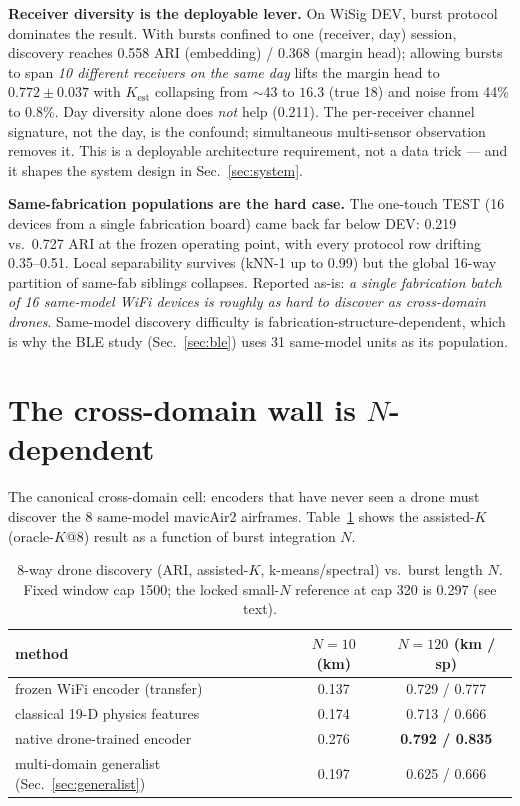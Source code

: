 \documentclass[conference]{IEEEtran}
\begin{document}
\textbf{Receiver diversity is the deployable lever.} On WiSig DEV, burst protocol dominates the
result. With bursts confined to one (receiver, day) session, discovery reaches 0.558 ARI
(embedding) / 0.368 (margin head); allowing bursts to span \emph{10 different receivers on the
same day} lifts the margin head to $0.772\pm0.037$ with $K_{\mathrm{est}}$ collapsing from
$\sim$43 to $16.3$ (true 18) and noise from 44\% to 0.8\%. Day diversity alone does \emph{not}
help (0.211). The per-receiver channel signature, not the day, is the confound; simultaneous
multi-sensor observation removes it. This is a deployable architecture requirement, not a data
trick --- and it shapes the system design in Sec.~\ref{sec:system}.

\textbf{Same-fabrication populations are the hard case.} The one-touch TEST (16 devices from a
single fabrication board) came back far below DEV: 0.219 vs.\ 0.727 ARI at the frozen operating
point, with every protocol row drifting 0.35--0.51. Local separability survives (kNN-1 up to
0.99) but the global 16-way partition of same-fab siblings collapses. Reported as-is: \emph{a
single fabrication batch of 16 same-model WiFi devices is roughly as hard to discover as
cross-domain drones}. Same-model discovery difficulty is fabrication-structure-dependent, which
is why the BLE study (Sec.~\ref{sec:ble}) uses 31 same-model units as its population.

\section{The cross-domain wall is $N$-dependent}
\label{sec:wall}

The canonical cross-domain cell: encoders that have never seen a drone must discover the 8
same-model mavicAir2 airframes. Table~\ref{tab:wall} shows the assisted-$K$ (oracle-$K$@8)
result as a function of burst integration $N$.

\begin{table}[t]
\caption{8-way drone discovery (ARI, assisted-$K$, k-means/spectral) vs.\ burst length $N$.
Fixed window cap 1500; the locked small-$N$ reference at cap 320 is 0.297 (see text).}
\label{tab:wall}
\centering\small
\begin{tabular}{lcc}
\toprule
method & $N{=}10$ (km) & $N{=}120$ (km / sp) \\
\midrule
frozen WiFi encoder (transfer) & 0.137 & 0.729 / 0.777 \\
classical 19-D physics features & 0.174 & 0.713 / 0.666 \\
native drone-trained encoder & 0.276 & \textbf{0.792 / 0.835} \\
multi-domain generalist (Sec.~\ref{sec:generalist}) & 0.197 & 0.625 / 0.666 \\
\bottomrule
\end{tabular}
\end{table}
\end{document}

